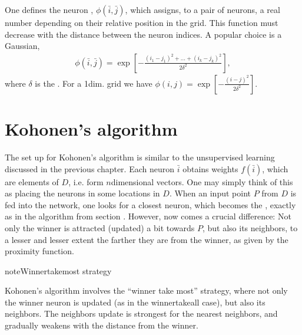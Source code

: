 \documentclass[letterpaper,10pt,english]{jupyterBook}
\begin{document}
\sphinxAtStartPar
One defines the neuron , \(\phi (\bar {i}, \bar {j})\), which assigns, to a pair of neurons, a real number depending on their relative position in the grid. This function must decrease with the distance between the neuron indices. A popular choice is a Gaussian,
\begin{equation*}
\begin{split} \phi(\bar{i}, \bar{j})=\exp\left [ -\frac{(i_1-j_1)^2+...+(i_k-j_k)^2}{2 \delta^2} \right ] ,\end{split}
\end{equation*}
\sphinxAtStartPar
where \(\delta\) is the . For a 1\sphinxhyphen{}dim. grid we have \( \phi(i,j)=\exp\left [ -\frac{(i-j)^2}{2 \delta^2} \right ]\).


\section{Kohonen’s algorithm}
\label{\detokenize{docs/som:kohonen-s-algorithm}}
\sphinxAtStartPar
The set up for Kohonen’s algorithm is similar to the unsupervised learning discussed in the previous chapter. Each neuron \(\bar{i}\) obtains weights \(f\left(\bar{i}\right)\), which are elements of \(D\), i.e. form \(n\)\sphinxhyphen{}dimensional vectors. One may simply think of this as placing the neurons in some locations in \(D\). When an input point \(P\) from \(D\) is fed into the network, one looks for a closest neuron, which becomes the , exactly as in the algorithm from section {\hyperref[\detokenize{docs/unsupervised:inn-sec}]{}}. However, now comes a crucial difference: Not only the winner is attracted (updated) a bit towards \(P\), but also its neighbors, to a lesser and lesser extent the farther they are from the winner, as given by the proximity function.

\begin{sphinxadmonition}{note}{Winner\sphinxhyphen{}take\sphinxhyphen{}most strategy}

\sphinxAtStartPar
Kohonen’s algorithm involves the “winner take most” strategy, where not only the winner neuron is updated (as in the winner\sphinxhyphen{}take\sphinxhyphen{}all case), but also its neighbors. The neighbors update is strongest for the nearest neighbors, and gradually weakens with the distance from the winner.
\end{sphinxadmonition}
\end{document}
